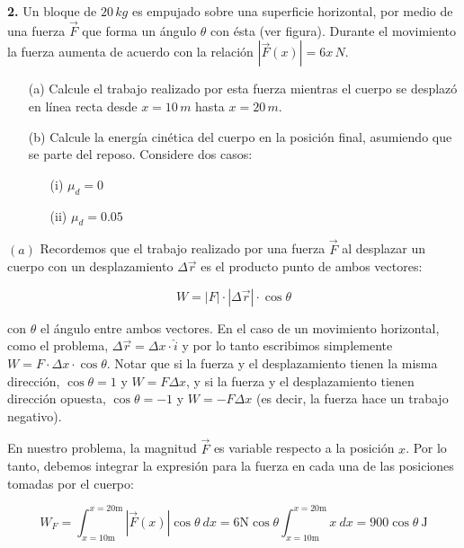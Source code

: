 \documentclass[12pt]{article}
\theoremstyle{definition}
\begin{document}
\begin{shaded}
    
\textbf{2.} Un bloque de $20 \, kg$ es empujado sobre una superficie horizontal, 
por medio de una fuerza $\vec{F}$ que forma un ángulo $\theta$ con ésta 
(ver figura). Durante el movimiento la fuerza aumenta de acuerdo con la 
relación $|\vec{F}(x)| = 6x \, N$.

\begin{enumerate}
    \item[(a)] Calcule el trabajo realizado por esta fuerza mientras el cuerpo 
    se desplazó en línea recta desde $x = 10 \, m$ hasta $x = 20 \, m$.
    
    \item[(b)] Calcule la energía cinética del cuerpo en la posición final, 
    asumiendo que se parte del reposo. Considere dos casos: 
    \begin{enumerate}
        \item[(i)] $\mu_d = 0$
        \item[(ii)] $\mu_d = 0.05$
    \end{enumerate}
\end{enumerate}

\end{shaded}

$(a)$ Recordemos que el trabajo realizado por una fuerza $\vec{F}$ al desplazar
un cuerpo con un desplazamiento $\Delta \vec{r}$ es el producto punto de ambos
vectores: 

\begin{equation}
    W = \left| F \right| \cdot \left| \Delta \vec{r} \right| \cdot \cos \theta
\end{equation}

con $\theta$ el ángulo entre ambos vectores. En el caso de un movimiento
horizontal, como el problema, $\Delta \vec{r} = \Delta x \cdot \hat{i}$  y por
lo tanto escribimos simplemente $W = F \cdot \Delta x \cdot \cos \theta$. Notar
que si la fuerza y el desplazamiento tienen la misma dirección, $\cos \theta =
1$ y $W = F \Delta x$, y si la fuerza y el desplazamiento tienen dirección
opuesta, $\cos \theta = -1$ y $W = -F \Delta x$ (es decir, la fuerza hace un
trabajo negativo).

En nuestro problema, la magnitud $\vec{F}$ es variable respecto a la posición
$x$. Por lo tanto, debemos integrar la expresión para la fuerza en cada una de
las posiciones tomadas por el cuerpo:

\begin{equation*}
    W_F 
    = \int_{x = 10\text{m}}^{x=20\text{m}} \left| \vec{F}(x) \right| \cos \theta ~ dx
    = 6\text{N} \cos \theta \int_{x = 10\text{m}}^{x=20\text{m}} x ~ dx = 900
    \cos \theta ~ \text{J}
\end{equation*}
\end{document}
